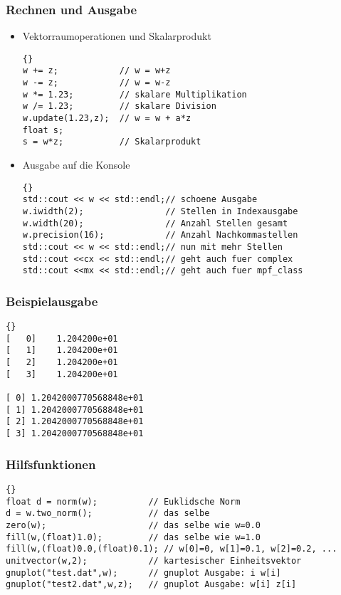 \documentclass[a4paper,11pt]{article}
\theoremstyle{definition}
\begin{document}
\begin{frame}[fragile]
\frametitle{Rechnen und Ausgabe}
\begin{itemize}
\item Vektorraumoperationen und Skalarprodukt\\
{\footnotesize{\begin{lstlisting}{}
w += z;            // w = w+z
w -= z;            // w = w-z
w *= 1.23;         // skalare Multiplikation
w /= 1.23;         // skalare Division
w.update(1.23,z);  // w = w + a*z
float s;
s = w*z;           // Skalarprodukt
\end{lstlisting}}}
\item Ausgabe auf die Konsole\\
{\footnotesize{\begin{lstlisting}{}
std::cout << w << std::endl;// schoene Ausgabe
w.iwidth(2);                // Stellen in Indexausgabe
w.width(20);                // Anzahl Stellen gesamt
w.precision(16);            // Anzahl Nachkommastellen
std::cout << w << std::endl;// nun mit mehr Stellen
std::cout <<cx << std::endl;// geht auch fuer complex
std::cout <<mx << std::endl;// geht auch fuer mpf_class
\end{lstlisting}}}
\end{itemize}
\end{frame}

\begin{frame}[fragile]
\frametitle{Beispielausgabe}
{\footnotesize{\begin{lstlisting}{}
[   0]    1.204200e+01
[   1]    1.204200e+01
[   2]    1.204200e+01
[   3]    1.204200e+01

[ 0] 1.2042000770568848e+01
[ 1] 1.2042000770568848e+01
[ 2] 1.2042000770568848e+01
[ 3] 1.2042000770568848e+01
\end{lstlisting}}}
\end{frame}

\begin{frame}[fragile]
\frametitle{Hilfsfunktionen}
{\footnotesize{\begin{lstlisting}{}
float d = norm(w);          // Euklidsche Norm
d = w.two_norm();           // das selbe
zero(w);                    // das selbe wie w=0.0
fill(w,(float)1.0);         // das selbe wie w=1.0
fill(w,(float)0.0,(float)0.1); // w[0]=0, w[1]=0.1, w[2]=0.2, ...
unitvector(w,2);            // kartesischer Einheitsvektor
gnuplot("test.dat",w);      // gnuplot Ausgabe: i w[i]
gnuplot("test2.dat",w,z);   // gnuplot Ausgabe: w[i] z[i]
\end{lstlisting}}}
\end{frame}
\end{document}
